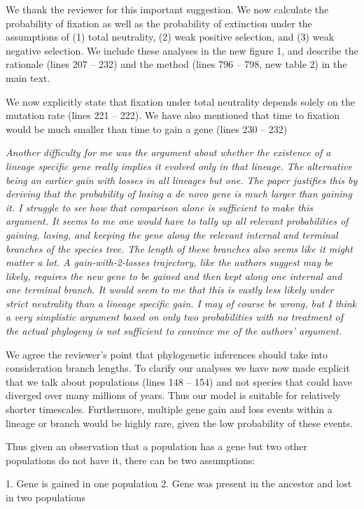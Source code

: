 \documentclass[12pt,a4paper]{article}
\begin{document}
We thank the reviewer for this important suggestion. We now calculate the probability of fixation as well as the probability of extinction under the assumptions of (1) total neutrality, (2) weak positive selection, and (3) weak negative selection. We include these analyses in the new figure 1, and describe the rationale (lines 207 -- 232) and the method (lines 796 -- 798, new table 2) in the main text. 

We now explicitly state that fixation under total neutrality depends solely on the mutation rate (lines 221 -- 222). We have also mentioned that time to fixation would be much smaller than time to gain a gene (lines 230 -- 232)

{\itshape Another difficulty for me was the argument about whether the existence of a lineage specific gene really implies it evolved only in that lineage. The alternative being an earlier gain with losses in all lineages but one. The paper justifies this by deriving that the probability of losing a de novo gene is much larger than gaining it. I struggle to see how that comparison alone is sufficient to make this argument. It seems to me one would have to tally up all relevant probabilities of gaining, losing, and keeping the gene along the relevant internal and terminal branches of the species tree. The length of these branches also seems like it might matter a lot. A gain-with-2-losses trajectory, like the authors suggest may be likely, requires the new gene to be gained and then kept along one internal and one terminal branch. It would seem to me that this is vastly less likely under strict neutrality than a lineage specific gain. I may of course be wrong, but I think a very simplistic argument based on only two probabilities with no treatment of the actual phylogeny is not sufficient to convince me of the authors' argument.}

We agree the reviewer's point that phylogenetic inferences should take into consideration branch lengths. To clarify our analyses we have now made explicit that we talk about populations (lines 148 -- 154) and not species that could have diverged over many millions of years. Thus our model is suitable for relatively shorter timescales. Furthermore, multiple gene gain and loss events within a lineage or branch would be highly rare, given the low probability of these events. 

Thus given an observation that a population has a gene but two other populations do not have it, there can be two assumptions:

1. Gene is gained in one population
2. Gene was present in the ancestor and lost in two populations
\end{document}
